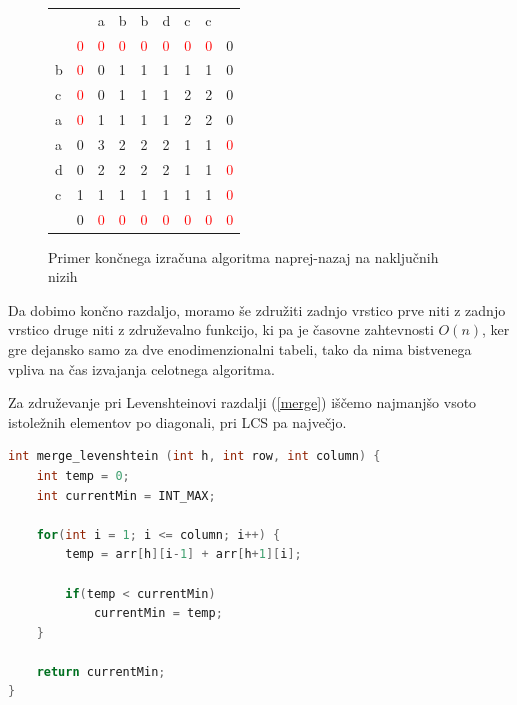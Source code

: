 \documentclass[a4paper,12pt,openright]{book}
\begin{document}
\begin{figure}[htb]
\begin{center}
\begin{tabular}{|l|l|l|l|l|l|l|l|l|}
\cline{3-8}
  \multicolumn{2}{c|}{}  & a & b & b & d & c & c & \multicolumn{1}{|c}{} \\ \cline{2-9}
 \multicolumn{1}{c|}{} & \textcolor{red}{0} & \textcolor{red}{0} & \textcolor{red}{0} & \textcolor{red}{0} & \textcolor{red}{0} & \textcolor{red}{0} & \textcolor{red}{0} & 0 \\ \hline
b  & \textcolor{red}{0}  & 0 & 1 & 1 & 1 & 1 & 1 & 0 \\ \hline
c  & \textcolor{red}{0} & 0 & 1 & 1 & 1 & 2 & 2 & 0 \\ \hline
a  & \textcolor{red}{0} & \cellcolor{blue!15}1 & \cellcolor{blue!15}1 & \cellcolor{blue!15}1 & \cellcolor{blue!15}1 & \cellcolor{blue!15}2 & \cellcolor{blue!15}2 & 0 \\ \hline
a  & 0 & \cellcolor{blue!15}3  & \cellcolor{blue!15}2 &  \cellcolor{blue!15}2 & \cellcolor{blue!15}2 & \cellcolor{blue!15}1 & \cellcolor{blue!15}1 & \textcolor{red}{0} \\ \hline
d  & 0 & 2 & 2 & 2 & 2 & 1 & 1 & \textcolor{red}{0} \\ \hline
c  & 1 & 1 & 1 & 1 & 1 & 1 & 1 & \textcolor{red}{0} \\ \hline
\multicolumn{1}{c|}{}  & 0 & \textcolor{red}{0} & \textcolor{red}{0} & \textcolor{red}{0} & \textcolor{red}{0} & \textcolor{red}{0} & \textcolor{red}{0} & \textcolor{red}{0} \\ \cline{2-9}
\end{tabular}

\end{center}
\caption{Primer končnega izračuna algoritma naprej-nazaj na naključnih nizih}
\label{fbLCSresult}
\end{figure}

Da dobimo končno razdaljo, moramo še združiti zadnjo vrstico prve niti z zadnjo vrstico druge niti z združevalno funkcijo, ki pa je časovne zahtevnosti \begin{math}O(n)\end{math}, ker gre dejansko samo za dve enodimenzionalni tabeli, tako da nima bistvenega vpliva na čas izvajanja celotnega algoritma. 

Za združevanje pri Levenshteinovi razdalji (\ref{merge}) iščemo najmanjšo vsoto istoležnih elementov po diagonali, pri LCS pa največjo. 


\bigskip
\begin{lstlisting}[language=C++, caption={Združevalna funkcija za Levenshteinovo razdaljo}, captionpos=b, label=merge]
int merge_levenshtein (int h, int row, int column) {
    int temp = 0;
    int currentMin = INT_MAX;

    for(int i = 1; i <= column; i++) {
        temp = arr[h][i-1] + arr[h+1][i];

        if(temp < currentMin)
            currentMin = temp;
    }

    return currentMin;
}
\end{lstlisting}
\end{document}
